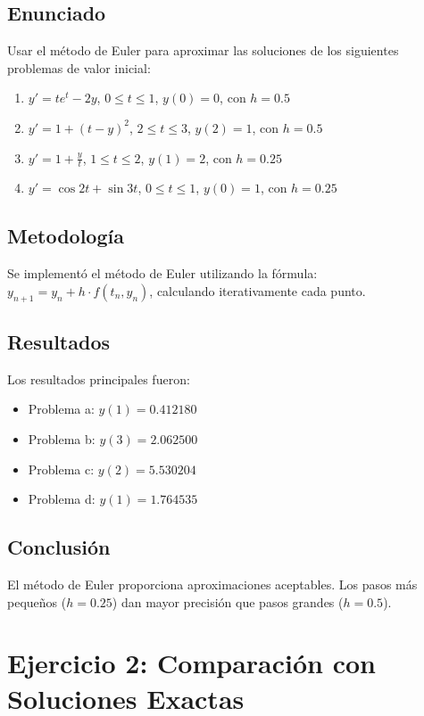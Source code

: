\documentclass[12pt,a4paper]{article}
\begin{document}
\subsection{Enunciado}
Usar el método de Euler para aproximar las soluciones de los siguientes problemas de valor inicial:

\begin{enumerate}
    \item $y' = te^t - 2y$, $0 \leq t \leq 1$, $y(0) = 0$, con $h = 0.5$
    \item $y' = 1 + (t - y)^2$, $2 \leq t \leq 3$, $y(2) = 1$, con $h = 0.5$
    \item $y' = 1 + \frac{y}{t}$, $1 \leq t \leq 2$, $y(1) = 2$, con $h = 0.25$
    \item $y' = \cos 2t + \sin 3t$, $0 \leq t \leq 1$, $y(0) = 1$, con $h = 0.25$
\end{enumerate}

\subsection{Metodología}
Se implementó el método de Euler utilizando la fórmula: $y_{n+1} = y_n + h \cdot f(t_n, y_n)$, calculando iterativamente cada punto.

\subsection{Resultados}
Los resultados principales fueron:
\begin{itemize}
    \item Problema a: $y(1) = 0.412180$
    \item Problema b: $y(3) = 2.062500$
    \item Problema c: $y(2) = 5.530204$
    \item Problema d: $y(1) = 1.764535$
\end{itemize}

\subsection{Conclusión}
El método de Euler proporciona aproximaciones aceptables. Los pasos más pequeños ($h = 0.25$) dan mayor precisión que pasos grandes ($h = 0.5$).

\section{Ejercicio 2: Comparación con Soluciones Exactas}
\end{document}
